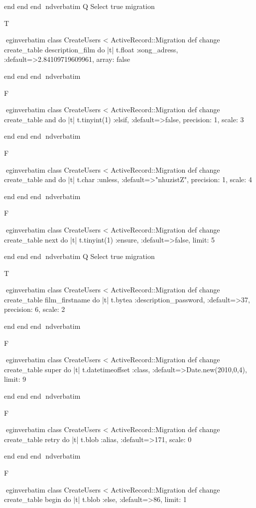     end 
  end 
end
nd{verbatim}
Q
 Select true migration

T

egin{verbatim}
 class CreateUsers < ActiveRecord::Migration 
  def change 
    create_table description_film do |t| 
      t.float :song_adress, :default=>2.84109719609961, array: false
    
    end 
  end 
end
nd{verbatim}

F

egin{verbatim}
 class CreateUsers < ActiveRecord::Migration 
  def change 
    create_table and do |t| 
      t.tinyint(1) :elsif, :default=>false, precision: 1, scale: 3
    
    end 
  end 
end
nd{verbatim}

F

egin{verbatim}
 class CreateUsers < ActiveRecord::Migration 
  def change 
    create_table and do |t| 
      t.char :unless, :default=>"nhuzistZ", precision: 1, scale: 4
    
    end 
  end 
end
nd{verbatim}

F

egin{verbatim}
 class CreateUsers < ActiveRecord::Migration 
  def change 
    create_table next do |t| 
      t.tinyint(1) :ensure, :default=>false, limit: 5
    
    end 
  end 
end
nd{verbatim}
Q
 Select true migration

T

egin{verbatim}
 class CreateUsers < ActiveRecord::Migration 
  def change 
    create_table film_firstname do |t| 
      t.bytea :description_password, :default=>37, precision: 6, scale: 2
    
    end 
  end 
end
nd{verbatim}

F

egin{verbatim}
 class CreateUsers < ActiveRecord::Migration 
  def change 
    create_table super do |t| 
      t.datetimeoffset :class, :default=>Date.new(2010,0,4), limit: 9
    
    end 
  end 
end
nd{verbatim}

F

egin{verbatim}
 class CreateUsers < ActiveRecord::Migration 
  def change 
    create_table retry do |t| 
      t.blob :alias, :default=>171, scale: 0
    
    end 
  end 
end
nd{verbatim}

F

egin{verbatim}
 class CreateUsers < ActiveRecord::Migration 
  def change 
    create_table begin do |t| 
      t.blob :else, :default=>86, limit: 1
    
